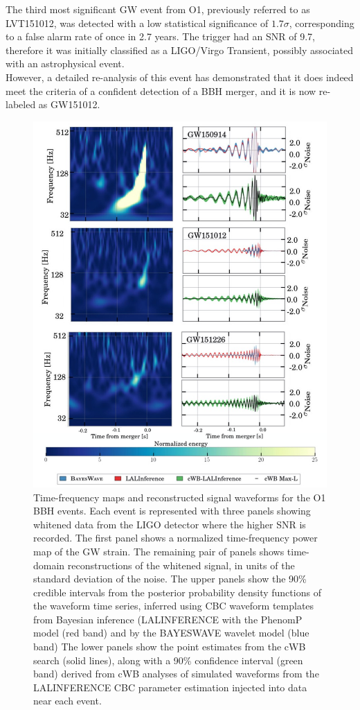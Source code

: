 \documentclass[binding=0.6cm, LaM]{sapthesis}
\begin{document}
	The third most significant GW event from O1, previously referred to as LVT151012,
	was detected with a low statistical significance of $1.7\sigma$, 
	corresponding to a false alarm rate of once in 2.7 years. 
	The trigger had an SNR of 9.7, therefore it was initially classified as a LIGO/Virgo Transient, 
	possibly associated with an astrophysical event. \\
	However, a detailed re-analysis of this event has demonstrated that it does indeed 
	meet the criteria of a confident detection of a BBH merger, and it is now re-labeled as GW151012.
                \begin{figure}[H]
                        \label{o1}
                        \includegraphics[scale=0.45]{o1}
                        \centering
                        \caption{Time-frequency maps and reconstructed signal waveforms for the O1 BBH events. Each event is represented with three panels showing whitened data from the LIGO detector where the higher SNR is recorded. The first panel shows a normalized time-frequency power map of the GW strain. The remaining pair of panels shows time-domain reconstructions of the whitened signal, in units of the standard deviation of the noise. The upper panels show the 90\% credible intervals from the posterior probability density functions of the waveform time series, inferred using CBC waveform templates from Bayesian inference (LALINFERENCE with the PhenomP model (red band) and by the BAYESWAVE wavelet model (blue band) The lower panels show the point estimates from the cWB search (solid lines), along with a 90\% confidence interval (green band) derived from cWB analyses of simulated waveforms from the LALINFERENCE CBC parameter estimation injected into data near each event. \cite{193}}

\end{figure}
\end{document}
